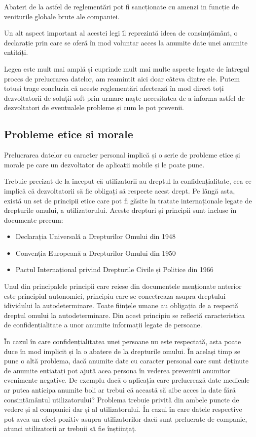 \documentclass[12pt]{article}
\begin{document}
Abateri de la astfel de reglementări pot fi sancționate cu amenzi in funcție de
veniturile globale brute ale companiei.

Un alt aspect important al acestei legi îl reprezintă ideea de consimțământ, o declarație prin care
se oferă în mod voluntar acces la anumite date unei anumite entități. 

Legea este mult mai amplă și cuprinde mult mai multe aspecte legate de întregul proces
de prelucrarea datelor, am reamintit aici doar câteva dintre ele. 
Putem totuși trage concluzia că aceste reglementări afectează în mod direct toți
dezvoltatorii de soluții soft prin urmare naște necesitatea de a informa astfel de
dezvoltatori de eventualele probleme și cum le pot prevenii.

\newpage
\subsection{Probleme etice si morale}

Prelucrarea datelor cu caracter personal implică și o serie de probleme etice și morale
pe care un dezvoltator de aplicații mobile și le poate pune. 

Trebuie precizat de la început că utilizatorii au dreptul la confidențialitate, cea ce implică că
dezvoltatorii să fie obligați să respecte acest drept. Pe lângă asta, există un set
de principii etice care pot fi găsite în tratate internaționale legate de drepturile
omului, a utilizatorului. Aceste drepturi și principii sunt incluse în documente precum:
\begin{itemize}
    \item Declarația Universală a Drepturilor Omului din 1948
    \item Convenția Europeană a Drepturilor Omului din 1950
    \item Pactul Internațional privind Drepturile Civile și Politice din 1966
\end{itemize}

Unul din principalele principii care reiese din documentele menționate anterior
este principiul autonomiei, principiu care se concetreaza asupra dreptului idividului
la autodeterminare. Toate ființele umane au obligația de a respectă dreptul omului
la autodeterminare. Din acest principiu se reflectă caracteristica de confidențialitate
a unor anumite informații legate de persoane.

În cazul în care confidențialitatea unei persoane nu este respectată, asta poate
duce în mod implicit și la o abatere de la drepturile omului. În același timp se pune
o altă problema, dacă anumite date cu caracter personal care sunt deținute
de anumite entiatați pot ajută acea persona în vederea prevenirii anumitor 
evenimente negative. De exemplu dacă o aplicația care prelucrează date medicale
ar putea anticipa anumite boli ar trebui că această să aibe acces la date
fără consințământul utilizatorului? Problema trebuie privită din ambele puncte de vedere
și al companiei dar și al utilizatorului. În cazul în care datele respective pot
avea un efect pozitiv asupra utilizatorilor dacă sunt prelucrate de companie, atunci
utilizatorii ar trebuii să fie înștiințaț.
\end{document}
